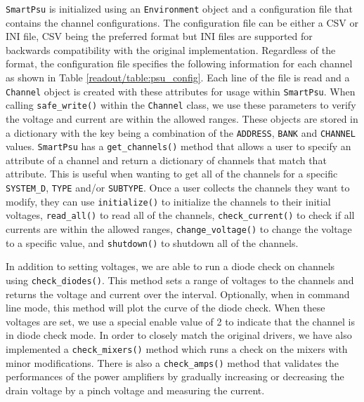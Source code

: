 \texttt{SmartPsu} is initialized using an \texttt{Environment} object and a configuration file that contains the channel configurations.
The configuration file can be either a CSV or INI file, CSV being the preferred format but INI files are supported for backwards compatibility with the original implementation.
Regardless of the format, the configuration file specifies the following information for each channel as shown in Table \ref{readout/table:psu_config}.
Each line of the file is read and a \texttt{Channel} object is created with these attributes for usage within \texttt{SmartPsu}.
When calling \texttt{safe\_write()} within the \texttt{Channel} class, we use these parameters to verify the voltage and current are within the allowed ranges.
These objects are stored in a dictionary with the key being a combination of the \texttt{ADDRESS}, \texttt{BANK} and \texttt{CHANNEL} values.
\texttt{SmartPsu} has a \texttt{get\_channels()} method that allows a user to specify an attribute of a channel and return a dictionary of channels that match that attribute.
This is useful when wanting to get all of the channels for a specific \texttt{SYSTEM\_D}, \texttt{TYPE} and/or \texttt{SUBTYPE}.
Once a user collects the channels they want to modify, they can use \texttt{initialize()} to initialize the channels to their initial voltages, \texttt{read\_all()} to read all of the channels, \texttt{check\_current()} to check if all currents are within the allowed ranges, \texttt{change\_voltage()} to change the voltage to a specific value, and \texttt{shutdown()} to shutdown all of the channels.

In addition to setting voltages, we are able to run a diode check on channels using \texttt{check\_diodes()}. 
This method sets a range of voltages to the channels and returns the voltage and current over the interval.
Optionally, when in command line mode, this method will plot the curve of the diode check. 
When these voltages are set, we use a special enable value of 2 to indicate that the channel is in diode check mode. 
In order to closely match the original drivers, we have also implemented a \texttt{check\_mixers()} method which runs a check on the mixers with minor modifications.
There is also a \texttt{check\_amps()} method that validates the performances of the power amplifiers by gradually increasing or decreasing the drain voltage by a pinch voltage and measuring the current.

